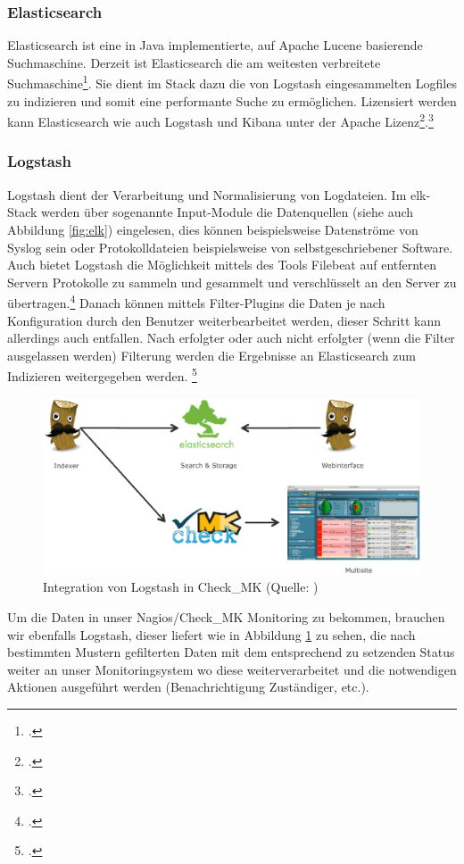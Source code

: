 \documentclass[12pt,a4paper,parskip,listof=totoc,bibliography=totoc]{scrreprt}
\begin{document}
	\subsubsection{Elasticsearch}
	Elasticsearch ist eine in Java implementierte, auf Apache Lucene basierende Suchmaschine. Derzeit ist Elasticsearch die am weitesten verbreitete Suchmaschine\footcite{dbenginesranking}. Sie dient im Stack dazu die von Logstash eingesammelten Logfiles zu indizieren und somit eine performante Suche zu ermöglichen. Lizensiert werden kann Elasticsearch wie auch Logstash und Kibana unter der Apache Lizenz\footcite{apachelicence}.\footcite{elasticsearch}
	\subsubsection{Logstash}
	Logstash dient der Verarbeitung und Normalisierung von Logdateien. Im \acrshort{elk}-Stack werden über sogenannte Input-Module die Datenquellen (siehe auch Abbildung \ref{fig:elk}) eingelesen, dies können beispielsweise Datenströme von Syslog sein oder Protokolldateien beispielsweise von selbstgeschriebener Software. Auch bietet Logstash die Möglichkeit mittels des Tools Filebeat auf entfernten Servern Protokolle zu sammeln und gesammelt und verschlüsselt an den Server zu übertragen.\footcite{filebeat} Danach können mittels Filter-Plugins die Daten je nach Konfiguration durch den Benutzer weiterbearbeitet werden, dieser Schritt kann allerdings auch entfallen. Nach erfolgter oder auch nicht erfolgter (wenn die Filter ausgelassen werden) Filterung werden die Ergebnisse an Elasticsearch zum Indizieren weitergegeben werden. \footcite{logstash}
	\begin{figure}
	\centering
	\includegraphics[width=1\linewidth]{pics/logstashcheckmk}
	\caption{Integration von Logstash in Check\_MK (Quelle: \cite{elkcheckmk})}
	\label{fig:logstashcheckmk}
	\end{figure}
	Um die Daten in unser Nagios/Check\_MK Monitoring zu bekommen, brauchen wir ebenfalls Logstash, dieser liefert wie in Abbildung \ref{fig:logstashcheckmk} zu sehen, die nach bestimmten Mustern gefilterten Daten mit dem entsprechend zu setzenden Status weiter an unser Monitoringsystem wo diese weiterverarbeitet und die notwendigen Aktionen ausgeführt werden (Benachrichtigung Zuständiger, etc.).
\end{document}
